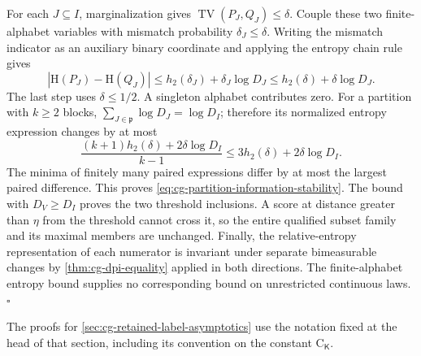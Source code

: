 For each $J\subseteq I$, marginalization gives
$\operatorname{TV}(P_J,Q_J)\leq\delta$. Couple these two finite-alphabet variables
with mismatch probability $\delta_J\leq\delta$. Writing the mismatch indicator as
an auxiliary binary coordinate and applying the entropy chain rule gives
\begin{equation*}
|\mathrm H(P_J)-\mathrm H(Q_J)|
\leq h_2(\delta_J)+\delta_J\log D_J
\leq h_2(\delta)+\delta\log D_J.
\end{equation*}
The last step uses $\delta\leq1/2$. A singleton alphabet contributes zero. For a
partition with $k\geq2$ blocks, $\sum_{J\in\mathfrak p}\log D_J=\log D_I$;
therefore its normalized entropy expression changes by at most
\begin{equation*}
\frac{(k+1)h_2(\delta)+2\delta\log D_I}{k-1}
\leq3h_2(\delta)+2\delta\log D_I.
\end{equation*}
The minima of finitely many paired expressions differ by at most the largest
paired difference. This proves \eqref{eq:cg-partition-information-stability}.
The bound with $D_V\geq D_I$ proves the two threshold inclusions. A score at distance
greater than $\eta$ from the threshold cannot cross it, so the entire qualified
subset family and its maximal members are unchanged. Finally, the relative-entropy
representation of each numerator is invariant under separate bimeasurable changes
by \cref{thm:cg-dpi-equality} applied in both directions. The finite-alphabet entropy
bound supplies no corresponding bound on unrestricted continuous laws. $\square$

The proofs for \cref{sec:cg-retained-label-asymptotics} use the notation fixed at the head of
that section, including its convention on the constant $\mathrm C_{\mathsf K}$.

